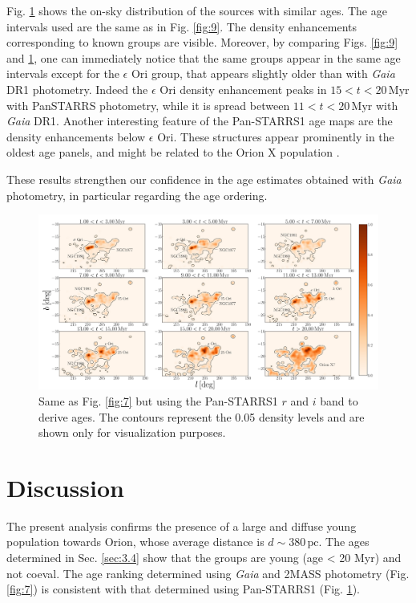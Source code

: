 \documentclass[twocolumn]{aa}
\begin{document}
Fig. \ref{fig:10} shows the on-sky distribution of the sources with similar ages. The age intervals used are the same as in Fig. \ref{fig:9}. The density enhancements corresponding to known groups are visible. Moreover, by comparing Figs. \ref{fig:9} and \ref{fig:10}, one can immediately notice that the same groups appear in the same age intervals except for  the $\epsilon$ Ori group, that appears slightly older than with \textit{Gaia} DR1 photometry. Indeed the $\epsilon$ Ori density enhancement peaks in $15 < t < 20 \, \mathrm{Myr}$ with PanSTARRS photometry, while it is spread between $11 < t < 20 \, \mathrm{Myr}$ with \textit{Gaia} DR1. 
Another interesting feature of the Pan-STARRS1 age maps are the density enhancements below $\epsilon$ Ori. These structures appear prominently in the oldest age panels, and might be related to the Orion X population \citep{Bouy2015}. 


These results strengthen our confidence in the age estimates obtained with \textit{Gaia} photometry, in particular regarding the age ordering. 

\begin{figure}
\includegraphics[width = \hsize]{fig12.pdf}
\caption{Same as Fig. \ref{fig:7} but using the Pan-STARRS1 $r$ and $i$ band to derive ages. The contours represent the 0.05 density levels and are shown only for visualization purposes.}
\label{fig:10}
\end{figure}


\section{Discussion}
The present analysis confirms the presence of a large and diffuse young population towards Orion, whose average distance is  $d \sim 380 \, \mathrm{pc}$.
The ages determined in Sec. \ref{sec:3.4} show that the groups are young (age < 20 Myr) and not coeval. The age ranking determined using \textit{Gaia} and 2MASS photometry (Fig. \ref{fig:7})  is  consistent with that determined using Pan-STARRS1 (Fig. \ref{fig:10}). 
\end{document}
